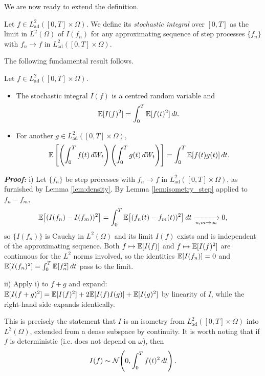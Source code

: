 \medskip

We are now ready to extend the definition.

\begin{definition}\label{def:stochastic_integral}
Let $f \in L^2_{\mathrm{ad}}([0,T]\times\Omega)$. We define its \emph{stochastic integral} over $[0,T]$ as the limit in $L^2(\Omega)$ of $I(f_n)$ for any approximating sequence of step processes $\{f_n\}$ with $f_n \to f$ in $L^2_{\mathrm{ad}}([0,T]\times\Omega)$.
\end{definition}

The following fundamental result follows.

\begin{theorem}\label{thm:itoisometry}

Let $f \in L^2_{\mathrm{ad}}([0,T]\times \Omega)$.
\begin{itemize}
    \item[i)] The stochastic integral $I(f)$ is a centred random variable and
    \[
    \mathbb{E}[I(f)^2] = \int_0^T \mathbb{E}[f(t)^2]\,dt.
    \]

    \item[ii)] For another $g \in L^2_{\mathrm{ad}}([0,T]\times\Omega)$,
    \[
    \mathbb{E}\left[\left(\int_0^T f(t)\,dW_t\right)\left(\int_0^T g(t)\,dW_t\right)\right]
    = \int_0^T \mathbb{E}[f(t)g(t)]\,dt.
    \]
\end{itemize}
\end{theorem}
\textbf{\textit{Proof:}} i) Let $\{f_n\}$ be step processes with $f_n \to f$ in
$L^2_{\mathrm{ad}}([0,T]\times\Omega)$, as furnished by Lemma \ref{lem:density}. By Lemma
\ref{lem:isometry_step} applied to $f_n - f_m$,
\[
\mathbb{E}\bigl[(I(f_n)-I(f_m))^2\bigr] = \int_0^T \mathbb{E}\bigl[(f_n(t)-f_m(t))^2\bigr]\,dt
\xrightarrow[n,m\to\infty]{} 0,
\]
so $\{I(f_n)\}$ is Cauchy in $L^2(\Omega)$ and its limit $I(f)$ exists and is independent of the
approximating sequence. Both $f \mapsto \mathbb{E}[I(f)]$ and $f \mapsto \mathbb{E}[I(f)^2]$ are
continuous for the $L^2$ norms involved, so the identities $\mathbb{E}[I(f_n)]=0$ and
$\mathbb{E}[I(f_n)^2] = \int_0^T\mathbb{E}[f_n^2]\,dt$ pass to the limit.

ii) Apply i) to $f+g$ and expand:
$\mathbb{E}[I(f+g)^2] = \mathbb{E}[I(f)^2] + 2\mathbb{E}[I(f)I(g)] + \mathbb{E}[I(g)^2]$ by linearity
of $I$, while the right-hand side expands identically.\qedfilledtext

\medskip

\noindent This is precisely the statement that $I$ is an isometry from $L^2_{\mathrm{ad}}([0,T]\times\Omega)$ into $L^2(\Omega)$, extended
from a dense subspace by continuity. It is worth noting that if $f$ is deterministic (i.e. does not depend on $\omega$), then
\[
I(f) \sim \mathcal{N}\!\left(0, \int_0^T f(t)^2\,dt\right).
\]

